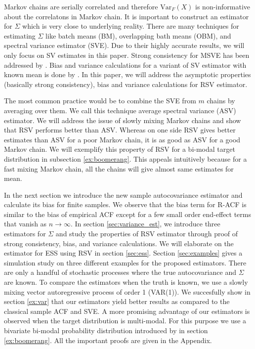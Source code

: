\documentclass[11pt]{article}
\newcommand{\Var}{\text{Var}}
\theoremstyle{remark}
\begin{document}
Markov chains are serially correlated and therefore $\Var_F(X)$ is non-informative about the correlatons in Markov chain. It is important to construct an estimator for $\Sigma$ which is very close to underlying reality. There are many techniques for estimating $\Sigma$ like batch means (BM), overlapping bath means (OBM), and spectral variance estimator (SVE). Due to their highly accurate results, we will only focus on SV estimates in this paper. Strong consistency for MSVE has been addressed by \cite{vats:fleg:jon:2018}. Bias and variance calculations for a variant of SV estimator with known mean is done by \cite{hannan2009multiple}. In this paper, we will address the asymptotic properties (basically strong consistency), bias and variance calculations for RSV estimator. 

The most common practice would be to combine the SVE from $m$ chains by averaging over them. We call this technique average spectral variance (ASV) estimator. We will address the issue of slowly mixing Markov chains and show that RSV performs better than ASV. Whereas on one side RSV gives better estimates than ASV for a poor Markov chain, it is as good as ASV for a good Markov chain. We will exemplify this property of RSV for a bi-modal target distribution in subsection \ref{ex:boomerang}. This appeals intuitively because for a fast mixing Markov chain, all the chains will give almost same estimates for mean. 

In the next section we introduce the new sample autocovariance estimator and calculate its bias for finite samples. We observe that the bias term for R-ACF is similar to the bias of empirical ACF except for a few small order end-effect terms that vanish as $n \to \infty$. In section \ref{sec:variance_est}, we introduce three estimators for $\Sigma$ and study the properties of RSV estimator through proof of strong consistency, bias, and variance calculations. We will elaborate on the estimator for ESS using RSV in section \ref{sec:ess}. Section \ref{sec:examples} gives a simulation study on three different examples for the proposed estimators. There are only a handful of stochastic processes where the true autocovariance and $\Sigma$ are known. To compare the estimators when the truth is known, we use a slowly mixing vector autoregressive process of order 1 (VAR(1)). We succesfully show in section \ref{ex:var} that our estimators yield better results as compared to the classical sample ACF and SVE. A more promising advantage of our estimators is observed when the target distribution is multi-modal. For this purpose we use a bivariate bi-modal probability distribution introduced by \cite{gelman1991note} in section \ref{ex:boomerang}. All the important proofs are given in the Appendix. 
\end{document}
